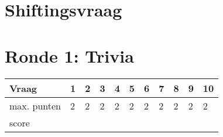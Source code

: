 \section{Shiftingsvraag}

\enspace\hrulefill


\section{Ronde 1: Trivia}
\begin{questions}

\question[2] \enspace\hrulefill
\vspace{5mm}
\question[2] \enspace\hrulefill
\vspace{5mm}
\question[2] \enspace\hrulefill
\vspace{5mm}
\question[2] \enspace\hrulefill
\vspace{5mm}
\question[2] \enspace\hrulefill
\vspace{5mm}
\question[2] \enspace\hrulefill
\vspace{5mm}
\question[2] \enspace\hrulefill
\vspace{5mm}
\question[2] \enspace\hrulefill
\vspace{5mm}
\question[2] \enspace\hrulefill
\vspace{5mm}
\question[2] \enspace\hrulefill

\end{questions}
\begin{table}[!b]
\centering
\begin{tabular}{|l|l|l|l|l|l|l|l|l|l|l|}
\hline
Vraag       & 1 & 2 & 3 & 4 & 5 & 6 & 7 & 8 & 9 & 10 \\ \hline
max. punten & 2 & 2 & 2 & 2 & 2 & 2 & 2 & 2 & 2 & 2  \\ \hline
score       &   &   &   &   &   &   &   &   &   &    \\ \hline
\end{tabular}
\end{table}
\newpage
